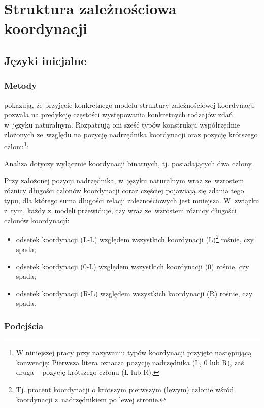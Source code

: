 \chapter{Struktura zależnościowa koordynacji} \label{ch3}

\section{Języki inicjalne \citep{przepiorkowski2023conjunct}}

\subsection{Metody}

\cite{przepiorkowski2023conjunct} pokazują, że przyjęcie konkretnego modelu struktury zależnościowej koordynacji pozwala na predykcję częstości występowania konkretnych rodzajów zdań w~języku naturalnym. Rozpatrują oni sześć typów konstrukcji współrzędnie złożonych ze~względu na pozycję nadrzędnika koordynacji oraz pozycję krótszego członu\footnote{
W niniejszej pracy przy nazywaniu typów koordynacji przyjęto następującą konwencję: Pierwsza litera oznacza pozycję nadrzędnika (L, 0 lub R), zaś druga -- pozycję krótszego członu (L lub R).}:



Analiza dotyczy wyłącznie koordynacji binarnych, tj. posiadających dwa człony.

Przy założonej pozycji nadrzędnika, w~języku naturalnym wraz ze~wzrostem różnicy długości członów koordynacji coraz częściej pojawiają się zdania tego typu, dla którego suma długości relacji zależnościowych jest mniejsza. W~związku z~tym, każdy z~modeli przewiduje, czy wraz ze~wzrostem różnicy długości członów koordynacji:
\begin{itemize}
\item odsetek koordynacji (L-L) względem wszystkich koordynacji (L)\footnote{
Tj. procent koordynacji o krótszym pierwszym (lewym) członie wśród koordynacji z~nadrzędnikiem po lewej stronie.}
rośnie, czy spada;
\item odsetek koordynacji (0-L) względem wszystkich koordynacji (0) rośnie, czy spada;
\item odsetek koordynacji (R-L) względem wszystkich koordynacji (R) rośnie, czy spada.
\end{itemize}

\subsection{Podejścia} \label{podejścia}

